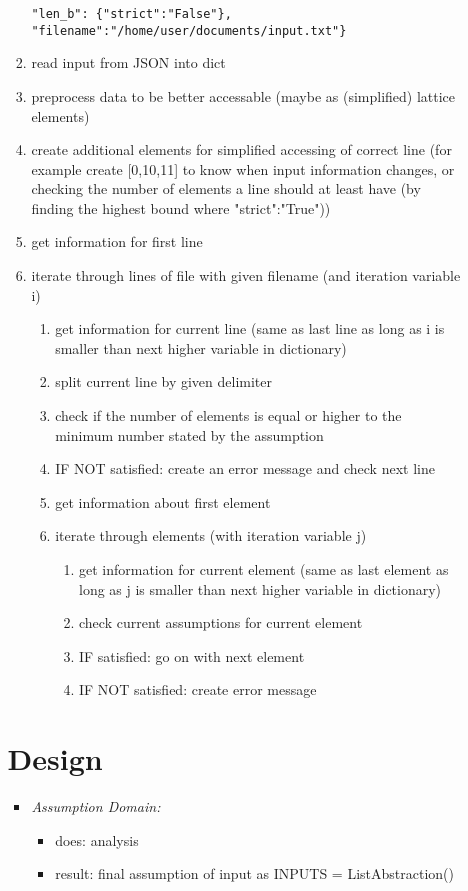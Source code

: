 \documentclass[11pt]{article}
\begin{document}
\begin{itemize}
\begin{itemize}
\begin{enumerate}
\verb|"len_b": {"strict":"False"}, "filename":"/home/user/documents/input.txt"}|
\item read input from JSON into dict
\item preprocess data to be better accessable (maybe as (simplified) lattice elements)
\item create additional elements for simplified accessing of correct line (for example create [0,10,11] to know when input information changes, or checking the number of elements a line should at least have (by finding the highest bound where "strict":"True"))
\item get information for first line
\item iterate through lines of file with given filename (and iteration variable i)
\begin{enumerate}
\item get information for current line (same as last line as long as i is smaller than next higher variable in dictionary)
\item split current line by given delimiter
\item check if the number of elements is equal or higher to the minimum number stated by the assumption
\item IF NOT satisfied: create an error message and check next line
\item get information about first element
\item iterate through elements (with iteration variable j)
\begin{enumerate}
\item get information for current element (same as last element as long as j is smaller than next higher variable in dictionary)
\item check current assumptions for current element
\item IF satisfied: go on with next element
\item IF NOT satisfied: create error message
\end{enumerate}
\end{enumerate}
\end{enumerate}

\section{Design}

\begin{itemize}
\item \textit{Assumption Domain:}
\begin{itemize}
\item does: analysis
\item result: final assumption of input as INPUTS = ListAbstraction()
\end{itemize}


\end{itemize}
\end{itemize}
\end{itemize}
\end{document}
